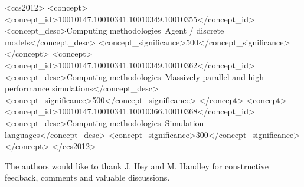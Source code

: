\documentclass[format=acmsmall, review=true, screen=true]{acmart}
\begin{document}
%
%
\begin{CCSXML}
<ccs2012>
<concept>
<concept_id>10010147.10010341.10010349.10010355</concept_id>
<concept_desc>Computing methodologies~Agent / discrete models</concept_desc>
<concept_significance>500</concept_significance>
</concept>
<concept>
<concept_id>10010147.10010341.10010349.10010362</concept_id>
<concept_desc>Computing methodologies~Massively parallel and high-performance simulations</concept_desc>
<concept_significance>500</concept_significance>
</concept>
<concept>
<concept_id>10010147.10010341.10010366.10010368</concept_id>
<concept_desc>Computing methodologies~Simulation languages</concept_desc>
<concept_significance>300</concept_significance>
</concept>
</ccs2012>
\end{CCSXML}



\maketitle

















\begin{acks}
The authors would like to thank J. Hey and M. Handley for constructive feedback, comments and valuable discussions.
\end{acks}



\end{document}
